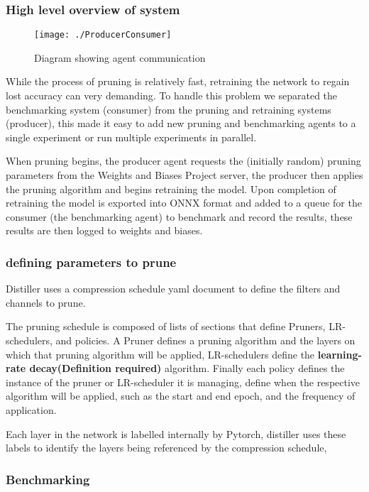 \documentclass[../Dissertation.tex]{subfiles}
\begin{document}
\subsubsection{High level overview of system}

\begin{figure}[H]
    \centering
    \texttt{[image: ./ProducerConsumer]}
    \caption{Diagram showing agent communication}
    \label{fig:agentCommunication}
\end{figure}

While the process of pruning is relatively fast, retraining the network to regain lost accuracy can very demanding. To handle this problem we separated the benchmarking system (consumer) from the pruning and retraining systems (producer), this made it easy to add new pruning and benchmarking agents to a single experiment or run multiple experiments in parallel.

When pruning begins, the producer agent requests the (initially random) pruning parameters from the Weights and Biases Project server, the producer then applies the pruning algorithm and begins retraining the model. Upon completion of retraining the model is exported into ONNX format and added to a queue for the consumer (the benchmarking agent) to benchmark and record the results, these results are then logged to weights and biases.

\subsubsection{defining parameters to prune}

Distiller uses a compression schedule yaml document to define the filters and channels to prune.

The pruning schedule is composed of lists of sections that define Pruners, LR-schedulers, and policies. A Pruner defines a pruning algorithm and the layers on which that pruning algorithm will be applied, LR-schedulers define the \textbf{learning-rate decay(Definition required)} algorithm. 
Finally each policy defines the instance of the pruner or LR-scheduler it is managing, define when the respective algorithm will be applied, such as the start and end epoch, and the frequency of application.

Each layer in the network is labelled internally by Pytorch, distiller uses these labels to identify the layers being referenced by the compression schedule, 

\subsubsection{Benchmarking}
\end{document}
